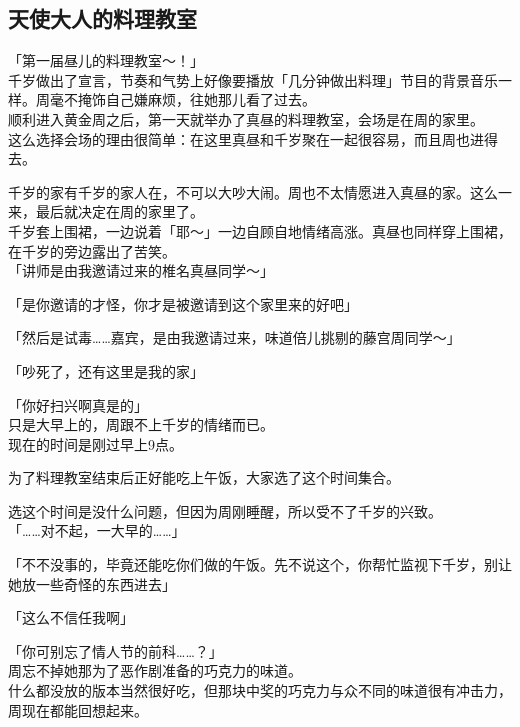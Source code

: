 \subsection{天使大人的料理教室}

「第一届昼儿的料理教室～！」\\

千岁做出了宣言，节奏和气势上好像要播放「几分钟做出料理」节目的背景音乐一样。周毫不掩饰自己嫌麻烦，往她那儿看了过去。\\

顺利进入黄金周之后，第一天就举办了真昼的料理教室，会场是在周的家里。\\

这么选择会场的理由很简单：在这里真昼和千岁聚在一起很容易，而且周也进得去。

千岁的家有千岁的家人在，不可以大吵大闹。周也不太情愿进入真昼的家。这么一来，最后就决定在周的家里了。\\

千岁套上围裙，一边说着「耶～」一边自顾自地情绪高涨。真昼也同样穿上围裙，在千岁的旁边露出了苦笑。\\

「讲师是由我邀请过来的椎名真昼同学～」

「是你邀请的才怪，你才是被邀请到这个家里来的好吧」

「然后是试毒……嘉宾，是由我邀请过来，味道倍儿挑剔的藤宫周同学～」

「吵死了，还有这里是我的家」

「你好扫兴啊真是的」\\

只是大早上的，周跟不上千岁的情绪而已。\\

现在的时间是刚过早上9点。

为了料理教室结束后正好能吃上午饭，大家选了这个时间集合。

选这个时间是没什么问题，但因为周刚睡醒，所以受不了千岁的兴致。\\

「……对不起，一大早的……」

「不不没事的，毕竟还能吃你们做的午饭。先不说这个，你帮忙监视下千岁，别让她放一些奇怪的东西进去」

「这么不信任我啊」

「你可别忘了情人节的前科……？」\\

周忘不掉她那为了恶作剧准备的巧克力的味道。\\

什么都没放的版本当然很好吃，但那块中奖的巧克力与众不同的味道很有冲击力，周现在都能回想起来。

